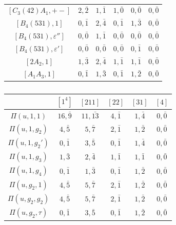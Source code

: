 \begin{landscape}
\begin{table}[h]
\begin{minipage}{0.40\textwidth}
\begin{tabular}{|c|ccccc|}
                $[C_3(42)A_1,+-]$ & $2,\bar2$ & $1,\bar1$ & $1,\bar0$ & $0,\bar0$ & $0,\bar0$ \\
                $[B_4(531),1]$ & $0,\bar1$ & $2,\bar{4}$ & $0,\bar1$ & $1,\bar{3}$ & $0,\bar0$ \\
                $[B_4(531),\varepsilon'']$ & $0,\bar0$ & $1,\bar1$ & $0,\bar0$ & $0,\bar0$ & $0,\bar0$ \\
                $[B_4(531),\varepsilon']$ & $0,\bar0$ & $0,\bar0$ & $0,\bar0$ & $0,\bar1$ & $0,\bar0$ \\
                $[2A_2,1]$ & $1,\bar{3}$ & $2,\bar{4}$ & $1,\bar1$ & $1,\bar1$ & $0,\bar0$ \\
                $[A_1A_3,1]$ & $0,\bar1$ & $1,\bar{3}$ & $0,\bar1$ & $1,\bar2$ & $0,\bar0$ \\\hline
            \end{tabular}
            \caption{}
        \end{minipage}
        \hfill
        \begin{minipage}{0.40\textwidth}
            \centering
            \begin{tabular}{|c|ccccc|}
                \hline
                & $[1^4]$ & $[211]$ & $[22]$ & $[31]$ & $[4]$ \\\hline
                $\Pi(u,1,1)$ & $16,\bar{9}$ & $11,\bar{13}$ & $4,\bar1$ & $1,\bar{4}$ & $0,\bar0$ \\
                $\Pi(u,1,g_2)$ & $4,\bar{5}$ & $5,\bar{7}$ & $2,\bar1$ & $1,\bar2$ & $0,\bar0$ \\
                $\Pi(u,1,g_2')$ & $0,\bar1$ & $3,\bar{5}$ & $0,\bar1$ & $1,\bar{4}$ & $0,\bar0$ \\
                $\Pi(u,1,g_3)$ & $1,\bar{3}$ & $2,\bar{4}$ & $1,\bar1$ & $1,\bar1$ & $0,\bar0$ \\
                $\Pi(u,1,g_4)$ & $0,\bar1$ & $1,\bar{3}$ & $0,\bar1$ & $1,\bar2$ & $0,\bar0$ \\\hline
                $\Pi(u,g_2,1)$ & $4,\bar{5}$ & $5,\bar{7}$ & $2,\bar1$ & $1,\bar2$ & $0,\bar0$ \\
                $\Pi(u,g_2,g_2)$ & $4,\bar{5}$ & $5,\bar{7}$ & $2,\bar1$ & $1,\bar2$ & $0,\bar0$ \\
                $\Pi(u,g_2,\tau)$ & $0,\bar1$ & $3,\bar{5}$ & $0,\bar1$ & $1,\bar2$ & $0,\bar0$ \\

\end{tabular}
\end{minipage}
\end{table}
\end{landscape}
